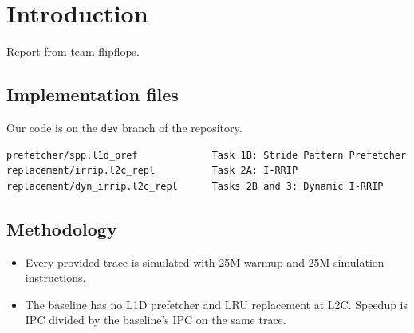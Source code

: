 \clearpage
\section{Introduction}

Report from team flipflops.

\subsection{Implementation files}

Our code is on the \texttt{dev} branch of the repository.

\begin{lstlisting}[style=plain]
prefetcher/spp.l1d_pref             Task 1B: Stride Pattern Prefetcher
replacement/irrip.l2c_repl          Task 2A: I-RRIP
replacement/dyn_irrip.l2c_repl      Tasks 2B and 3: Dynamic I-RRIP
\end{lstlisting}

\subsection{Methodology}

\begin{itemize}
  \item Every provided trace is simulated with 25M warmup and 25M simulation instructions.
  \item The baseline has no L1D prefetcher and LRU replacement at L2C.
        Speedup is IPC divided by the baseline's IPC on the same trace.
\end{itemize}
